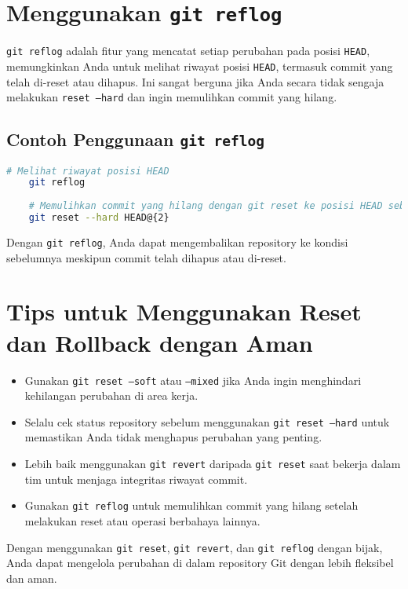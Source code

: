 \section{Menggunakan \texttt{git reflog}}

\texttt{git reflog} adalah fitur yang mencatat setiap perubahan pada posisi \texttt{HEAD}, memungkinkan Anda untuk melihat riwayat posisi \texttt{HEAD}, termasuk commit yang telah di-reset atau dihapus. Ini sangat berguna jika Anda secara tidak sengaja melakukan \texttt{reset --hard} dan ingin memulihkan commit yang hilang.

\subsection{Contoh Penggunaan \texttt{git reflog}}

\begin{lstlisting}[language=bash]
	# Melihat riwayat posisi HEAD
	git reflog
	
	# Memulihkan commit yang hilang dengan git reset ke posisi HEAD sebelumnya
	git reset --hard HEAD@{2}
\end{lstlisting}

Dengan \texttt{git reflog}, Anda dapat mengembalikan repository ke kondisi sebelumnya meskipun commit telah dihapus atau di-reset.

\section{Tips untuk Menggunakan Reset dan Rollback dengan Aman}

\begin{itemize}
	\item Gunakan \texttt{git reset --soft} atau \texttt{--mixed} jika Anda ingin menghindari kehilangan perubahan di area kerja.
	\item Selalu cek status repository sebelum menggunakan \texttt{git reset --hard} untuk memastikan Anda tidak menghapus perubahan yang penting.
	\item Lebih baik menggunakan \texttt{git revert} daripada \texttt{git reset} saat bekerja dalam tim untuk menjaga integritas riwayat commit.
	\item Gunakan \texttt{git reflog} untuk memulihkan commit yang hilang setelah melakukan reset atau operasi berbahaya lainnya.
\end{itemize}

Dengan menggunakan \texttt{git reset}, \texttt{git revert}, dan \texttt{git reflog} dengan bijak, Anda dapat mengelola perubahan di dalam repository Git dengan lebih fleksibel dan aman.
